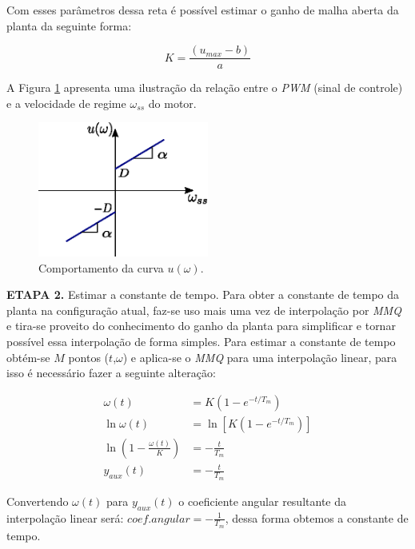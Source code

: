 Com esses parâmetros dessa reta é possível estimar o ganho de malha aberta da planta da seguinte forma:

\begin{equation}
    K = \frac{(u_{max} - b)}{a}
\end{equation}

A Figura \ref{fig:ilustracao_omega_x_pwm} apresenta uma ilustração da relação entre o \emph{PWM} (sinal de controle) e a velocidade de regime $\omega_{ss}$ do motor.

\begin{figure}[H]
    \centering
    \includegraphics[width=0.5\textwidth]{figuras/ilustracoes/omega_x_sinal_controle.eps}
    \caption{Comportamento da curva $u(\omega)$.}
    \label{fig:ilustracao_omega_x_pwm}
\end{figure}

    
\textbf{ETAPA 2.} Estimar a constante de tempo. Para obter a constante de tempo da planta na configuração atual, faz-se uso mais uma vez de interpolação por \textit{MMQ} e tira-se proveito do conhecimento do ganho da planta para simplificar e tornar possível essa interpolação de forma simples. Para estimar a constante de tempo obtém-se $M$ pontos ($t$,$\omega$) e aplica-se o \textit{MMQ} para uma interpolação linear, para isso é necessário fazer a seguinte alteração:
    

\begin{align*}
    \omega(t) &= K\left( 1 - e^{-t/T_m} \right)\\
    \ln{\omega(t)} &= \ln\left[K( 1 - e^{-t/T_m})\right]\\
    \ln\left(1 - \frac{\omega(t)}{K} \right) &= -\frac{t}{T_m}\\
    y_{aux}(t) &= -\frac{t}{T_m}
\end{align*}

Convertendo $\omega(t)$ para $y_{aux}(t)$ o coeficiente angular resultante da interpolação linear será: $coef.angular = -\frac{1}{T_m}$, dessa forma obtemos a constante de tempo.\\

